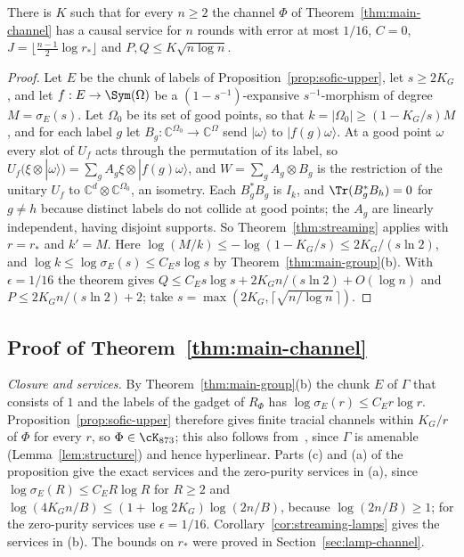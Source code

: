 \begin{corollary}\label{cor:streaming-lamps}
There is $K$ such that for every $n\ge2$ the channel $\Phi$ of Theorem~\ref{thm:main-channel} has a causal service for $n$ rounds with error at most
$1/16$, $C=0$, $J=\lfloor\frac{n-1}2\log r_*\rfloor$ and $P,Q\le K\sqrt{n\log n}$.
\end{corollary}

\begin{proof}
Let $E$ be the chunk of labels of Proposition~\ref{prop:sofic-upper}, let $s\ge2K_G$, and let
$f:E\to\Sym(\Omega)$ be a $(1-s^{-1})$-expansive $s^{-1}$-morphism of degree $M=\sigma_E(s)$. Let $\Omega_0$ be its set of good points, so that
$k=|\Omega_0|\ge(1-K_G/s)M$, and for each label $g$ let $B_g:\mathbb C^{\Omega_0}\to\mathbb C^\Omega$ send $|\omega\rangle$ to $|f(g)\omega\rangle$. At a good point
$\omega$ every slot of $U_f$ acts through the permutation of its label, so $U_f(\xi\otimes|\omega\rangle)=\sum_gA_g\xi\otimes|f(g)\omega\rangle$, and
$W=\sum_gA_g\otimes B_g$ is the restriction of the unitary $U_f$ to $\mathbb C^d\otimes\mathbb C^{\Omega_0}$, an isometry. Each $B_g^*B_g$ is $I_k$, and
$\Tr(B_g^*B_h)=0$ for $g\ne h$ because distinct labels do not collide at good points; the $A_g$ are linearly independent, having disjoint
supports. So Theorem~\ref{thm:streaming} applies with $r=r_*$ and $k'=M$. Here $\log(M/k)\le-\log(1-K_G/s)\le2K_G/(s\ln2)$, and
$\log k\le\log\sigma_E(s)\le C_Es\log s$ by Theorem~\ref{thm:main-group}(b). With $\epsilon=1/16$ the theorem gives
$Q\le C_Es\log s+2K_Gn/(s\ln2)+O(\log n)$ and $P\le2K_Gn/(s\ln2)+2$; take $s=\max(2K_G,\lceil\sqrt{n/\log n}\,\rceil)$.
\end{proof}

\subsection{Proof of Theorem~\ref{thm:main-channel}}\label{sec:main-channel-proof}

\emph{Closure and services.} By Theorem~\ref{thm:main-group}(b) the chunk $E$ of $\Gamma$ that consists of $1$ and the labels of the gadget of
$R_\Phi$ has $\log\sigma_E(r)\le C_Er\log r$. Proposition~\ref{prop:sofic-upper} therefore gives finite tracial channels within $K_G/r$ of $\Phi$ for
every $r$, so $\Phi\in\cK_{873}$; this also follows from~\cite{DouglasMghirbiB}, since $\Gamma$ is amenable (Lemma~\ref{lem:structure}) and hence
hyperlinear. Parts (c) and (a) of the proposition give the exact services and the zero-purity services in (a), since
$\log\sigma_E(R)\le C_ER\log R$ for $R\ge2$ and $\log(4K_Gn/B)\le(1+\log2K_G)\log(2n/B)$, because $\log(2n/B)\ge1$; for the zero-purity services use
$\epsilon=1/16$. Corollary~\ref{cor:streaming-lamps} gives the services in (b). The bounds on $r_*$ were proved in Section~\ref{sec:lamp-channel}.

